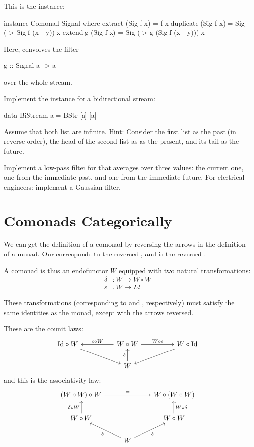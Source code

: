 \documentclass[DaoFP]{subfiles}
\begin{document}
This is the  instance:
\begin{haskell}
instance Comonad Signal where
  extract (Sig f x) = f x
  duplicate (Sig f x) = Sig (\y -> Sig f (x - y)) x
  extend g (Sig f x) = Sig (\y -> g (Sig f (x - y))) x
\end{haskell}
Here,  convolves the filter 
\begin{haskell}
g :: Signal a -> a
\end{haskell}
over the whole stream. 

\begin{exercise}
Implement the  instance for a bidirectional stream:
\begin{haskell}
data BiStream a = BStr [a] [a]
\end{haskell}
Assume that both list are infinite. Hint: Consider the first list as the past (in reverse order), the head of the second list as as the present, and its tail as the future.
\end{exercise}

\begin{exercise}
Implement a low-pass filter for  that averages over three values: the current one, one from the immediate past, and one from the immediate future. For electrical engineers: implement a Gaussian filter. 
\end{exercise}

\section{Comonads Categorically}

We can get the definition of a comonad by reversing the arrows in the definition of a monad. Our  corresponds to the reversed , and  is the reversed . 


A comonad is thus an endofunctor $W$ equipped with two natural transformations:
\begin{align*}
\delta &\colon W \to W \circ W \\
\varepsilon &\colon W \to \mathit{Id} 
\end{align*}

These transformations (corresponding to  and , respectively) must satisfy the same identities as the monad, except with the arrows reversed. 

These are the counit laws:
\[
 \begin{tikzcd}
\text{Id} \circ W
 \arrow[rrd, "="']
& & W \circ W
 \arrow[ll, "\varepsilon \circ W"']
 \arrow[rr, "W \circ \varepsilon"]
&& W \circ \text{Id}
 \arrow[lld, "="]
 \\
 && W
  \arrow[u, "\delta"]
 \end{tikzcd}
\]
and this is the associativity law:
\[
 \begin{tikzcd}
 (W \circ W) \circ W 
 \arrow[rr, "="]
 &&
 W \circ (W \circ W)
 \\
 W \circ W 
 \arrow[u, "\delta \circ W"]
& & W \circ W
 \arrow[u, "W \circ \delta"']
 \\
&  W
 \arrow[ul, "\delta"]
 \arrow[ur, "\delta"']
 \end{tikzcd}
\]
\end{document}
